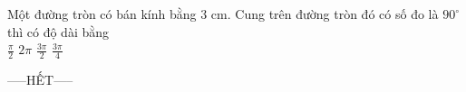 \documentclass[12pt,a4paper]{article}
\begin{document}
\begin{ex}
 Một đường tròn có bán kính bằng ${3}$ cm. Cung trên đường tròn đó có số đo là ${90}^\circ$ thì có độ dài bằng\\ 
\choice
{ $\frac{\pi}{2}$ }
   { $2 \pi$ }
     { \True $\frac{3 \pi}{2}$ }
    { $\frac{3 \pi}{4}$ }
\end{ex}


 \begin{center}
-----HẾT-----
\end{center}

\end{document}
